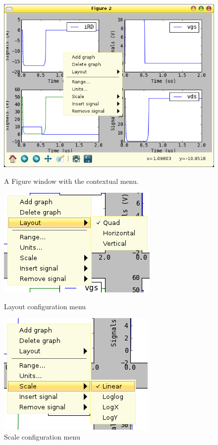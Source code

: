 \documentclass[a4paper,11pt]{article}
\begin{document}
\begin{figure}[htbp]
  \centering
  \includegraphics[scale=.5]{../png/ioscopy-figure}
  \caption{A Figure window with the contextual menu.}
  \label{fig:fig}

  \begin{minipage}{0.45\linewidth}
    \includegraphics[scale=.5]{../png/ioscopy-layout.png}
    \caption{Layout configuration menu}
    \label{fig:layout}
  \end{minipage}
  \begin{minipage}{0.45\linewidth}
    \includegraphics[scale=.5]{../png/ioscopy-scale.png}
    \caption{Scale configuration menu}
    \label{fig:scale}
  \end{minipage}


\end{figure}
\end{document}
